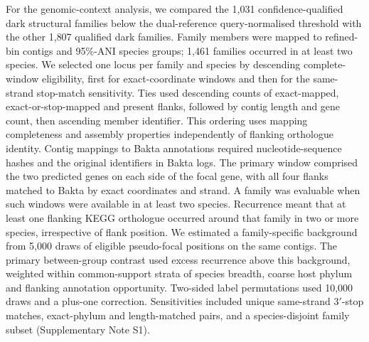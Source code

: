 \documentclass[11pt]{article}
\begin{document}
For the genomic-context analysis, we compared the 1{,}031 confidence-qualified dark structural
families below the dual-reference query-normalised threshold with the other 1{,}807 qualified
dark families. Family members were mapped to refined-bin contigs and 95\%-ANI species groups;
1{,}461 families occurred in at least two species. We selected one locus per family and species by descending complete-window eligibility, first
for exact-coordinate windows and then for the same-strand stop-match sensitivity. Ties used
descending counts of exact-mapped, exact-or-stop-mapped and present flanks, followed by contig
length and gene count, then ascending member identifier. This ordering uses mapping completeness
and assembly properties independently of flanking orthologue identity. Contig mappings to Bakta
annotations required nucleotide-sequence hashes and the original identifiers in Bakta logs.
The primary window comprised the two predicted genes on each side of the focal gene, with all
four flanks matched to Bakta by exact coordinates and strand. A family was evaluable when such
windows were available in at least two species. Recurrence meant that at least one flanking KEGG
orthologue occurred around that family in two or more species, irrespective of flank position.
We estimated a family-specific background from 5{,}000 draws of eligible pseudo-focal positions
on the same contigs. The primary between-group contrast used excess recurrence above this
background, weighted within common-support strata of species breadth, coarse host phylum and
flanking annotation opportunity. Two-sided label permutations used 10{,}000 draws and a plus-one
correction. Sensitivities included unique same-strand 3$'$-stop matches, exact-phylum and
length-matched pairs, and a species-disjoint family subset (Supplementary Note S1).
\end{document}
